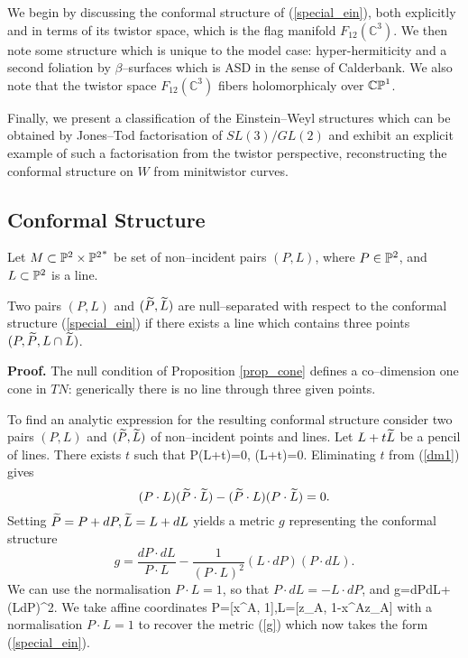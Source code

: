 We begin by discussing the  conformal structure
of (\ref{special_ein}), both explicitly and in terms of its twistor space, which is the flag manifold $F_{12}(\mathbb{C}^3)$. We then note some structure which is unique to the model case:  hyper-hermiticity and a second foliation by $\beta$--surfaces which is ASD in the sense of Calderbank. We also note that the twistor space  $F_{12}(\mathbb{C}^3)$ fibers holomorphicaly over $\mathbb{CP}^1$.

Finally, we present a classification of the Einstein--Weyl structures which can be obtained by Jones--Tod factorisation of $SL(3)/GL(2)$ and exhibit an explicit example of such a factorisation from the twistor perspective, reconstructing the conformal structure on $W$ from minitwistor curves.
\subsection{Conformal Structure}
\label{model_conf}
Let $M\subset \mathbb{P}^2\times {\mathbb{P}^2}^*$ be set of non--incident pairs 
$(P, L)$, where $P\in \mathbb{P}^2$, and $L\subset \mathbb{P}^2$ is a line. 
\begin{prop}
\label{prop_cone}
Two pairs $(P, L)$ and $(\widetilde{P}, \widetilde{L})$ are null--separated
with respect to the conformal structure (\ref{special_ein})
if there exists
a line which contains three points $(P, \widetilde{P}, L\cap \widetilde{L})$. 
\end{prop}
{\bf Proof.}
The  null condition of Proposition \ref{prop_cone}
defines a co--dimension one cone in $TN$: 
generically there is no line through three given points.

To find an analytic expression for the resulting conformal structure 
consider two pairs  $(P, L)$ and $(\widetilde{P}, \widetilde{L})$ 
of non--incident points and lines. Let $L+t\widetilde{L}$ be a pencil of lines. 
There exists $t$ such that 
\be
\label{dm1}
P\cdot (L+t\tL)=0,  \quad
\tP\cdot (L+t\tL)=0.
\ee 
Eliminating $t$ from 
(\ref{dm1}) gives
\[
(P\cdot L)(\widetilde{P}\cdot \widetilde{L})-(\widetilde{P}\cdot L)(P\cdot \widetilde{L})=0.
\]
Setting $\widetilde{P}=P+dP, \widetilde{L}=L+dL$ yields a metric 
$g$  representing the conformal structure
\[
g=\frac{dP\cdot dL}{P\cdot L}-\frac{1}{(P\cdot L)^2}(L\cdot dP)(P\cdot dL).
\]
We can use the normalisation $P\cdot L=1$, so that $P\cdot dL=-L\cdot dP$,
and
\be
\label{dm_metric}
g={dP\cdot dL}+(L\cdot dP)^2.
\ee
We take affine coordinates 
\be
\label{DM_parameter}
P=[x^A, 1],\quad L=[z_A, 1-x^Az_A]
\ee 
with a normalisation $P\cdot L=1$ to recover the metric (\ref{g}) which now takes the form (\ref{special_ein}).
\koniec
